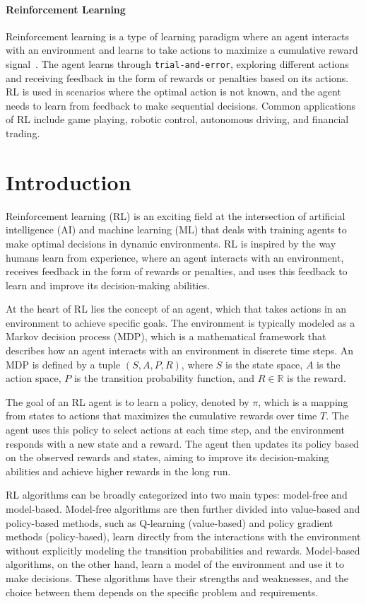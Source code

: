 \paragraph{Reinforcement Learning}
Reinforcement learning is a type of learning paradigm where an agent interacts with an environment and learns to take actions to maximize a cumulative reward signal~\cite{sutton2018reinforcement}.
The agent learns through \texttt{trial-and-error}, exploring different actions and receiving feedback in the form of rewards or penalties based on its actions.
RL is used in scenarios where the optimal action is not known, and the agent needs to learn from feedback to make sequential decisions.
Common applications of RL include game playing, robotic control, autonomous driving, and financial trading.


\section{Introduction}\label{sec:rl-introduction}
Reinforcement learning (RL) is an exciting field at the intersection of artificial intelligence (AI) and machine learning (ML) that deals with training agents to make optimal decisions in dynamic environments.
RL is inspired by the way humans learn from experience, where an agent interacts with an environment, receives feedback in the form of rewards or penalties, and uses this feedback to learn and improve its decision-making abilities.

At the heart of RL lies the concept of an agent, which that takes actions in an environment to achieve specific goals.
The environment is typically modeled as a Markov decision process (MDP), which is a mathematical framework that describes how an agent interacts with an environment in discrete time steps.
An MDP is defined by a tuple $(S, A, P, R)$, where $S$ is the state space, $A$ is the action space, $P$ is the transition probability function, and $R\in\mathbb{R}$ is the reward.

The goal of an RL agent is to learn a policy, denoted by $\pi$, which is a mapping from states to actions that maximizes the cumulative rewards over time $T$.
The agent uses this policy to select actions at each time step, and the environment responds with a new state and a reward.
The agent then updates its policy based on the observed rewards and states, aiming to improve its decision-making abilities and achieve higher rewards in the long run.

RL algorithms can be broadly categorized into two main types: model-free and model-based.
Model-free algorithms are then further divided into value-based and policy-based methods, such as Q-learning (value-based) and policy gradient methods (policy-based), learn directly from the interactions with the environment without explicitly modeling the transition probabilities and rewards.
Model-based algorithms, on the other hand, learn a model of the environment and use it to make decisions.
These algorithms have their strengths and weaknesses, and the choice between them depends on the specific problem and requirements.

